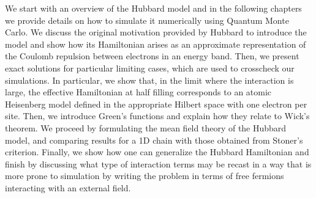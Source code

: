 \label{cap:hubbard}

\slshape

We start with an overview of the Hubbard model and in the following chapters we provide details on how to simulate it numerically using Quantum Monte Carlo. We discuss the original motivation provided by Hubbard to introduce the model and show how its Hamiltonian arises as an approximate representation of the Coulomb repulsion between electrons in an energy band. Then, we present exact solutions for particular limiting cases, which are used to crosscheck our simulations. In particular, we show that, in the limit where the interaction is large, the effective Hamiltonian at half filling corresponds to an atomic Heisenberg model defined in the appropriate Hilbert space with one electron per site.
Then, we introduce Green's functions and explain how they relate to Wick's theorem. We proceed by formulating the mean field theory of the Hubbard model, and comparing results for a \acs{1D} chain with those obtained from Stoner's criterion.
Finally, we show how one can generalize the Hubbard Hamiltonian and finish by discussing what type of interaction terms may be recast in a way that is more prone to simulation by writing the problem in terms of free fermions interacting with an external field.

\normalfont










